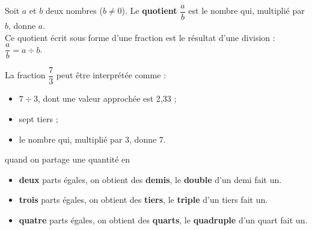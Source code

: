  \begin{definition}
    Soit $a$ et $b$ deux nombres ($b\neq0$). Le {\bf quotient} $\dfrac{a}{b}$ est le nombre qui, multiplié par $b$, donne $a$. \\
    Ce quotient écrit sous forme d'une fraction est le résultat d'une division : $\dfrac{a}{b} =a\div b$.
 \end{definition}
 
 \begin{exemple}
    La fraction $\dfrac73$ peut être interprétée comme :
    \correction
    \ \\ [-10mm]
    \begin{itemize}
       \item $7\div3$, dont une valeur approchée est 2,33 ;
       \item sept tiers ;
       \item le nombre qui, multiplié par $3$, donne $7$.
    \end{itemize}
 \end{exemple}
 
 \begin{remarque} 
    quand on partage une quantité en 
    \begin{itemize}
       \item  \textbf{deux} parts égales, on obtient des \textbf{demis}, le \textbf{double} d'un demi fait un.
       \item \textbf{trois} parts égales, on obtient des \textbf{tiers}, le \textbf{triple} d'un tiers fait un.
       \item \textbf{quatre} parts égales, on obtient des \textbf{quarts}, le \textbf{quadruple} d'un quart fait un.
    \end{itemize}
 \end{remarque}